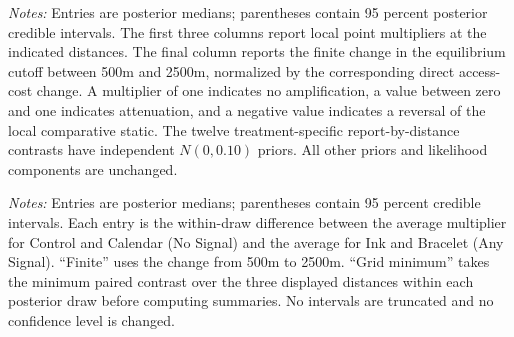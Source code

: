 \documentclass[12pt]{article}
\begin{document}
\begin{table}[htbp]
  \centering
  \small
  \caption{Social multipliers with asymmetric classification and tighter priors}
  \label{tab:tight-asymmetric-report-multipliers}
  \begin{threeparttable}
    
    \begin{tablenotes}\footnotesize
      \item \textit{Notes:} Entries are posterior medians; parentheses contain
      95 percent posterior credible intervals. The first three columns report
      local point multipliers at the indicated distances. The final column
      reports the finite change in the equilibrium cutoff between 500m and
      2500m, normalized by the corresponding direct access-cost change. A
      multiplier of one indicates no amplification, a value between zero and
      one indicates attenuation, and a negative value indicates a reversal of
      the local comparative static. The twelve treatment-specific
      report-by-distance contrasts have independent $N(0,0.10)$ priors. All
      other priors and likelihood components are unchanged.
    \end{tablenotes}
  \end{threeparttable}
\end{table}

\begin{table}[htbp]
  \centering
  \scriptsize
  \caption{Paired multiplier contrast across asymmetric-reporting specifications}
  \label{tab:asymmetric-report-contrasts}
  {\setlength{\tabcolsep}{4pt}%
  }
  \begin{minipage}{0.94\linewidth}
    \vspace{0.4em}\footnotesize
    \textit{Notes:} Entries are posterior medians; parentheses contain 95
    percent credible intervals. Each entry is the within-draw difference
    between the average multiplier for Control and Calendar (No Signal) and
    the average for Ink and Bracelet (Any Signal). ``Finite'' uses the change
    from 500m to 2500m. ``Grid minimum'' takes the minimum paired contrast over
    the three displayed distances within each posterior draw before computing
    summaries. No intervals are truncated and no confidence level is changed.
  \end{minipage}
\end{table}
\end{document}

